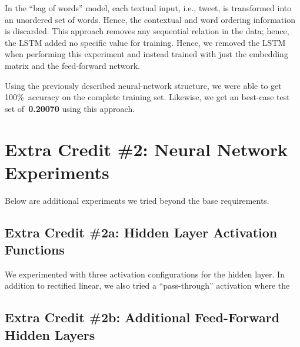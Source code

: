 \documentclass{report}
\begin{document}
  In the ``bag of words'' model, each textual input, i.e., tweet, is transformed into an unordered set of words.  Hence, the contextual and word ordering information is discarded.  This approach removes any sequential relation in the data; hence, the LSTM added no specific value for training.  Hence, we removed the LSTM when performing this experiment and instead trained with just the embedding matrix and the feed-forward network. 
  
  Using the previously described neural-network structure, we were able to get 100\%~accuracy on the complete training set.  Likewise, we get an best-case test set of~\textbf{0.20070} using this approach.
  
  \section{Extra Credit \#2: Neural Network Experiments}
  
  Below are additional experiments we tried beyond the base requirements.  
  
  \subsection{Extra Credit \#2a: Hidden Layer Activation Functions}
  
  We experimented with three activation configurations for the hidden layer.  In addition to rectified linear, we also tried a ``pass-through'' activation where the 
  
  \subsection{Extra Credit \#2b: Additional Feed-Forward Hidden Layers}
  
   
\end{document}
